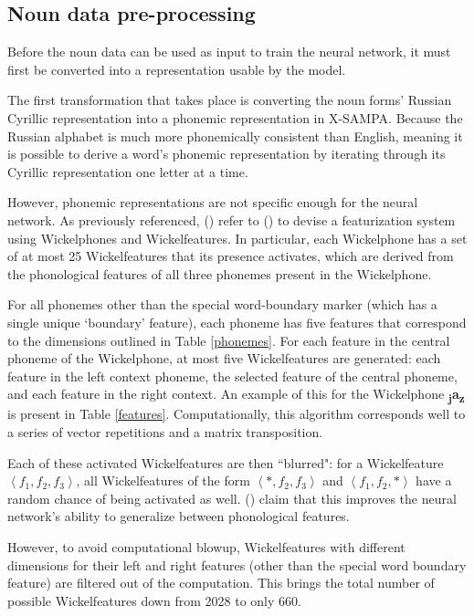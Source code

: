 \documentclass[11pt,a4paper]{article}
\newcommand{\citenp}[1]{\citeauthor{#1} (\citeyear{#1})}
\begin{document}
\subsection{Noun data pre-processing}

Before the noun data can be used as input to train the neural network, it must
first be converted into a representation usable by the model.

The first transformation that takes place is converting the noun forms'
Russian Cyrillic representation into a phonemic representation in X-SAMPA\@.
Because the Russian alphabet is much more phonemically consistent than English,
meaning it is possible to derive a word's phonemic representation by iterating
through its Cyrillic representation one letter at a time.

However, phonemic representations are not specific enough for the neural network.
As previously referenced, \citenp{RMcC} refer to \citenp{Wickelgren}
to devise a featurization system using Wickelphones and Wickelfeatures.
In particular, each Wickelphone has a set of at most 25 Wickelfeatures that its presence activates,
which are derived from the phonological features of all three phonemes present in the Wickelphone.

For all phonemes other than the special word-boundary marker (which has a single unique `boundary' feature),
each phoneme has five features that correspond to the dimensions outlined in Table \ref{phonemes}.
For each feature in the central phoneme of the Wickelphone, at most five Wickelfeatures are generated:
each feature in the left context phoneme, the selected feature of the central phoneme,
and each feature in the right context. An example of this for the Wickelphone
\textbf{\textsubscript{j}a\textsubscript{z}} is present in Table \ref{features}.
Computationally, this algorithm corresponds well to a series of vector repetitions and a matrix transposition.

Each of these activated Wickelfeatures are then ``blurred": for a Wickelfeature $\left< f_1, f_2, f_3 \right>$,
all Wickelfeatures of the form $\left< * , f_2, f_3 \right>$ and $\left< f_1, f_2, * \right>$ have a random chance of being activated
as well. \citenp{RMcC} claim that this improves the neural network's ability to generalize between
phonological features.

However, to avoid computational blowup, Wickelfeatures with different dimensions for their left and right features
(other than the special word boundary feature) are filtered out of the computation. This brings the total number
of possible Wickelfeatures down from 2028 to only 660.
\end{document}
